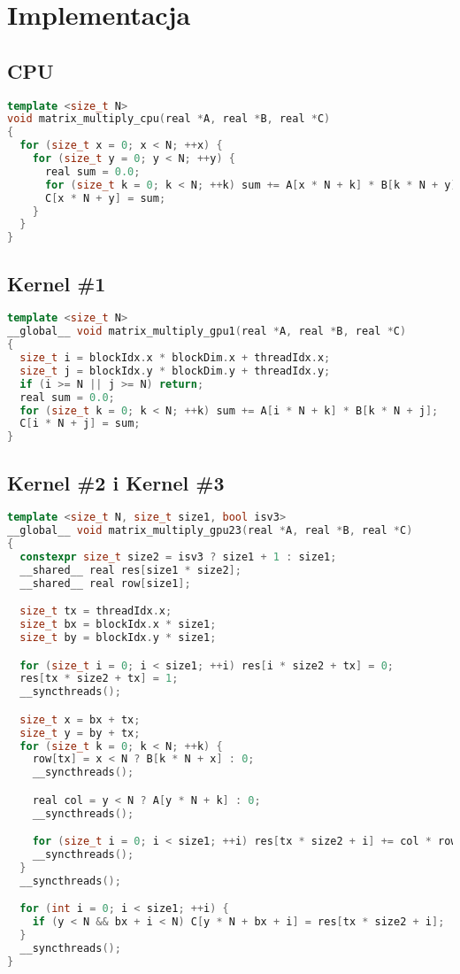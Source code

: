 \documentclass[12pt, a4paper]{article}
\begin{document}
\section*{Implementacja}

\subsection*{CPU}
\begin{lstlisting}[language = C++]
template <size_t N>
void matrix_multiply_cpu(real *A, real *B, real *C)
{
  for (size_t x = 0; x < N; ++x) {
    for (size_t y = 0; y < N; ++y) {
      real sum = 0.0;
      for (size_t k = 0; k < N; ++k) sum += A[x * N + k] * B[k * N + y];
      C[x * N + y] = sum;
    }
  }
}
\end{lstlisting}

\subsection*{Kernel \#1}
\begin{lstlisting}[language = C++]
template <size_t N>
__global__ void matrix_multiply_gpu1(real *A, real *B, real *C)
{
  size_t i = blockIdx.x * blockDim.x + threadIdx.x;
  size_t j = blockIdx.y * blockDim.y + threadIdx.y;
  if (i >= N || j >= N) return;
  real sum = 0.0;
  for (size_t k = 0; k < N; ++k) sum += A[i * N + k] * B[k * N + j];
  C[i * N + j] = sum;
}
\end{lstlisting}

\subsection*{Kernel \#2 i Kernel \#3}
\begin{lstlisting}[language = C++]
template <size_t N, size_t size1, bool isv3>
__global__ void matrix_multiply_gpu23(real *A, real *B, real *C)
{
  constexpr size_t size2 = isv3 ? size1 + 1 : size1;
  __shared__ real res[size1 * size2];
  __shared__ real row[size1];

  size_t tx = threadIdx.x;
  size_t bx = blockIdx.x * size1;
  size_t by = blockIdx.y * size1;

  for (size_t i = 0; i < size1; ++i) res[i * size2 + tx] = 0;
  res[tx * size2 + tx] = 1;
  __syncthreads();

  size_t x = bx + tx;
  size_t y = by + tx;
  for (size_t k = 0; k < N; ++k) {
    row[tx] = x < N ? B[k * N + x] : 0;
    __syncthreads();

    real col = y < N ? A[y * N + k] : 0;
    __syncthreads();

    for (size_t i = 0; i < size1; ++i) res[tx * size2 + i] += col * row[i];
    __syncthreads();
  }
  __syncthreads();

  for (int i = 0; i < size1; ++i) {
    if (y < N && bx + i < N) C[y * N + bx + i] = res[tx * size2 + i];
  }
  __syncthreads();
}
\end{lstlisting}
\end{document}
